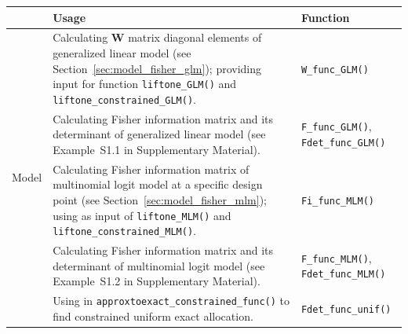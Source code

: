 \begin{table}[htb!]
\scriptsize
\begin{tabularx}{\textwidth}{c|b|m}
\toprule
                        & Usage                                             & Function   \\ \hline
\multirow[c]{8}{*}{Model}  & Calculating $\mathbf W$ matrix diagonal elements of generalized linear model (see Section~\ref{sec:model_fisher_glm}); providing input for function \texttt{liftone\_GLM()} and \texttt{liftone\_constrained\_GLM()}. & \texttt{W\_func\_GLM()} \\
                        &  Calculating Fisher information matrix and its determinant of generalized linear model (see Example~S1.1 in Supplementary Material). & \texttt{F\_func\_GLM()}, \texttt{Fdet\_func\_GLM()}\\
                        & Calculating Fisher information matrix of multinomial logit model at a specific design point (see Section~\ref{sec:model_fisher_mlm}); using as input of \texttt{liftone\_MLM()} and \texttt{liftone\_constrained\_MLM()}. & \texttt{Fi\_func\_MLM()}\\
                        & Calculating Fisher information matrix and its determinant of multinomial logit model (see Example~S1.2 in Supplementary Material). & \texttt{F\_func\_MLM()}, \texttt{Fdet\_func\_MLM()}\\
                        & Using in \texttt{approxtoexact\_constrained\_func()} to find constrained uniform exact allocation.             & \texttt{Fdet\_func\_unif()}\\\hline


\end{tabularx}
\end{table}
